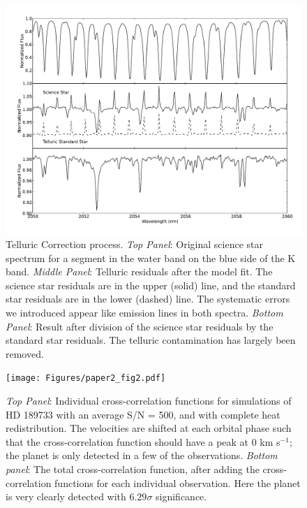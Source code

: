 

\begin{figure}[t]
  \centering
  \includegraphics[width=6.5in]{Figures/paper2_fig1.pdf}
  \caption{Telluric Correction process. \emph{Top Panel}: Original
    science star spectrum for a segment in the water band on the blue side of the K band.  \emph{Middle Panel}: Telluric residuals
    after the model fit. The science star residuals are in the upper (solid) line, and
    the standard star residuals are in the lower (dashed) line. The systematic errors we introduced appear like emission lines in both spectra. \emph{Bottom Panel}:
    Result after division of the science star residuals by the
    standard star residuals. The telluric contamination has largely been removed.}
  \label{paper2_fig:tellcorr}
\end{figure}


\begin{figure}[t]
  \centering
  \texttt{[image: Figures/paper2\_fig2.pdf]}
  \caption{\emph{Top Panel}: Individual cross-correlation functions for simulations of HD 189733 with an average S/N = 500, and with complete heat redistribution. The velocities are shifted at each orbital phase such that the cross-correlation function should have a peak at 0 km s$^{-1}$; the planet is only detected in a few of the observations. \emph{Bottom panel}: The total cross-correlation function, after adding the cross-correlation functions for each individual observation. Here the planet is very clearly detected with $6.29 \sigma$ significance.}
  \label{paper2_fig:allcorr}
\end{figure}


